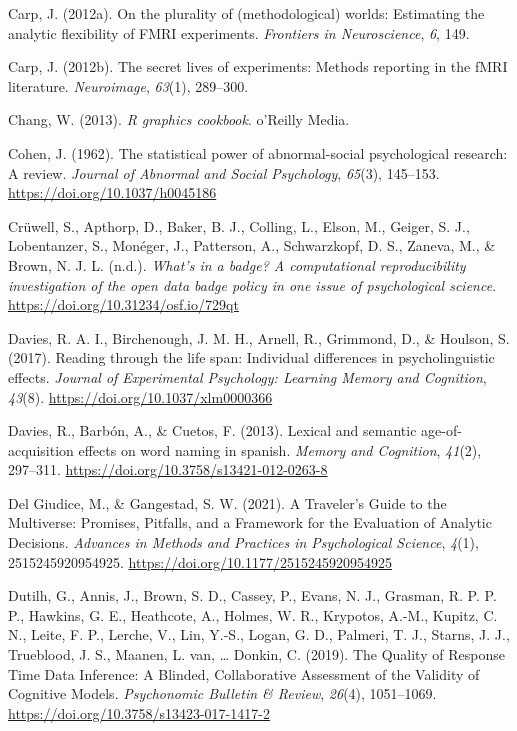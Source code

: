 \documentclass[
  letterpaper,
  DIV=11,
  numbers=noendperiod]{scrreprt}
\newlength{\cslhangindent}
\newlength{\cslentryspacingunit} %
\newenvironment{CSLReferences}[2] %
 {%
  \setlength{\parindent}{0pt}
  \ifodd #1
  \let\oldpar\par
  \def\par{\hangindent=\cslhangindent\oldpar}
  \fi
  \setlength{\parskip}{#2\cslentryspacingunit}
 }%
 {}
\begin{document}
\begin{CSLReferences}{1}{0}
\leavevmode{}%
Carp, J. (2012a). On the plurality of (methodological) worlds:
Estimating the analytic flexibility of FMRI experiments. \emph{Frontiers
in Neuroscience}, \emph{6}, 149.

\leavevmode{}%
Carp, J. (2012b). The secret lives of experiments: Methods reporting in
the fMRI literature. \emph{Neuroimage}, \emph{63}(1), 289--300.

\leavevmode{}%
Chang, W. (2013). \emph{R graphics cookbook}. o'Reilly Media.

\leavevmode{}%
Cohen, J. (1962). The statistical power of abnormal-social psychological
research: A review. \emph{Journal of Abnormal and Social Psychology},
\emph{65}(3), 145--153. \url{https://doi.org/10.1037/h0045186}

\leavevmode{}%
Crüwell, S., Apthorp, D., Baker, B. J., Colling, L., Elson, M., Geiger,
S. J., Lobentanzer, S., Monéger, J., Patterson, A., Schwarzkopf, D. S.,
Zaneva, M., \& Brown, N. J. L. (n.d.). \emph{What{'}s in a badge? A
computational reproducibility investigation of the open data badge
policy in one issue of psychological science}.
\url{https://doi.org/10.31234/osf.io/729qt}

\leavevmode{}%
Davies, R. A. I., Birchenough, J. M. H., Arnell, R., Grimmond, D., \&
Houlson, S. (2017). Reading through the life span: Individual
differences in psycholinguistic effects. \emph{Journal of Experimental
Psychology: Learning Memory and Cognition}, \emph{43}(8).
\url{https://doi.org/10.1037/xlm0000366}

\leavevmode{}%
Davies, R., Barbón, A., \& Cuetos, F. (2013). Lexical and semantic
age-of-acquisition effects on word naming in spanish. \emph{Memory and
Cognition}, \emph{41}(2), 297--311.
\url{https://doi.org/10.3758/s13421-012-0263-8}

\leavevmode{}%
Del Giudice, M., \& Gangestad, S. W. (2021). A Traveler{'}s Guide to the
Multiverse: Promises, Pitfalls, and a Framework for the Evaluation of
Analytic Decisions. \emph{Advances in Methods and Practices in
Psychological Science}, \emph{4}(1), 2515245920954925.
\url{https://doi.org/10.1177/2515245920954925}

\leavevmode{}%
Dutilh, G., Annis, J., Brown, S. D., Cassey, P., Evans, N. J., Grasman,
R. P. P. P., Hawkins, G. E., Heathcote, A., Holmes, W. R., Krypotos,
A.-M., Kupitz, C. N., Leite, F. P., Lerche, V., Lin, Y.-S., Logan, G.
D., Palmeri, T. J., Starns, J. J., Trueblood, J. S., Maanen, L. van,
\ldots{} Donkin, C. (2019). The Quality of Response Time Data Inference:
A Blinded, Collaborative Assessment of the Validity of Cognitive Models.
\emph{Psychonomic Bulletin \& Review}, \emph{26}(4), 1051--1069.
\url{https://doi.org/10.3758/s13423-017-1417-2}


\end{CSLReferences}
\end{document}
